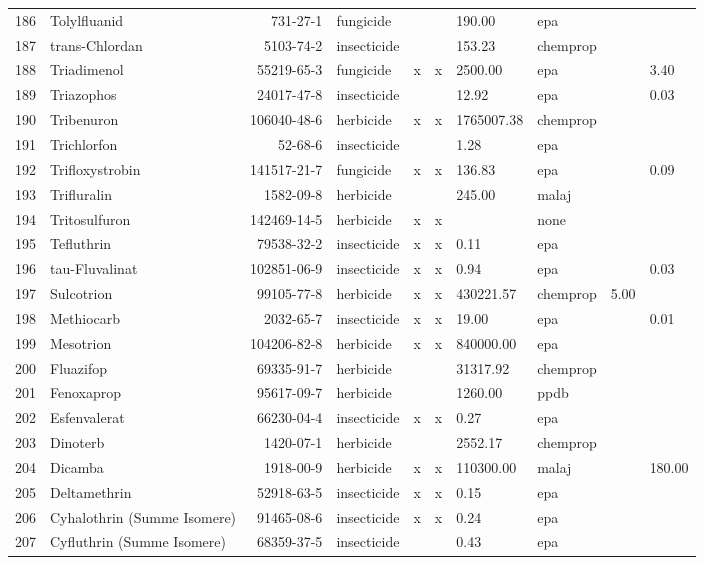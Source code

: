 \begin{longtable}{lp{3cm}rlp{0.5cm}p{0.5cm}p{1.5cm}p{1cm}p{1cm}p{1cm}}
  186 & Tolylfluanid & 731-27-1 & fungicide &  &  & 190.00 & epa &  &  \\ 
  187 & trans-Chlordan & 5103-74-2 & insecticide &  &  & 153.23 & chemprop &  &  \\ 
  188 & Triadimenol & 55219-65-3 & fungicide & x & x & 2500.00 & epa &  & 3.40 \\ 
  189 & Triazophos & 24017-47-8 & insecticide &  &  & 12.92 & epa &  & 0.03 \\ 
  190 & Tribenuron & 106040-48-6 & herbicide & x & x & 1765007.38 & chemprop &  &  \\ 
  191 & Trichlorfon & 52-68-6 & insecticide &  &  & 1.28 & epa &  &  \\ 
  192 & Trifloxystrobin & 141517-21-7 & fungicide & x & x & 136.83 & epa &  & 0.09 \\ 
  193 & Trifluralin & 1582-09-8 & herbicide &  &  & 245.00 & malaj &  &  \\ 
  194 & Tritosulfuron & 142469-14-5 & herbicide & x & x &  & none &  &  \\ 
  195 & Tefluthrin & 79538-32-2 & insecticide & x & x & 0.11 & epa &  &  \\ 
  196 & tau-Fluvalinat & 102851-06-9 & insecticide & x & x & 0.94 & epa &  & 0.03 \\ 
  197 & Sulcotrion & 99105-77-8 & herbicide & x & x & 430221.57 & chemprop & 5.00 &  \\ 
  198 & Methiocarb & 2032-65-7 & insecticide & x & x & 19.00 & epa &  & 0.01 \\ 
  199 & Mesotrion & 104206-82-8 & herbicide & x & x & 840000.00 & epa &  &  \\ 
  200 & Fluazifop & 69335-91-7 & herbicide &  &  & 31317.92 & chemprop &  &  \\ 
  201 & Fenoxaprop & 95617-09-7 & herbicide &  &  & 1260.00 & ppdb &  &  \\ 
  202 & Esfenvalerat & 66230-04-4 & insecticide & x & x & 0.27 & epa &  &  \\ 
  203 & Dinoterb & 1420-07-1 & herbicide &  &  & 2552.17 & chemprop &  &  \\ 
  204 & Dicamba & 1918-00-9 & herbicide & x & x & 110300.00 & malaj &  & 180.00 \\ 
  205 & Deltamethrin & 52918-63-5 & insecticide & x & x & 0.15 & epa &  &  \\ 
  206 & Cyhalothrin (Summe Isomere) & 91465-08-6 & insecticide & x & x & 0.24 & epa &  &  \\ 
  207 & Cyfluthrin (Summe Isomere) & 68359-37-5 & insecticide &  &  & 0.43 & epa &  &  \\ 

\end{longtable}
